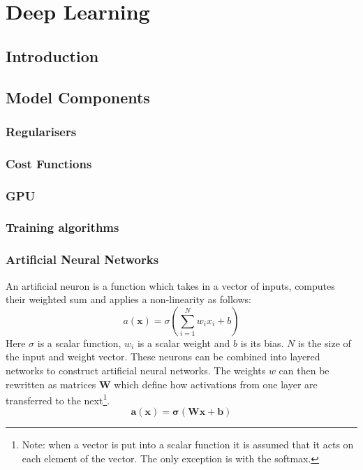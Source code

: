 \chapter{Deep Learning} \label{chapter:deep}
\section{Introduction}
\section{Model Components}
\subsection{Regularisers}
\subsection{Cost Functions}
\subsection{GPU} \label{sec:GPU}
\subsection{Training algorithms}
\subsection{Artificial Neural Networks}
An artificial neuron is a function which takes in a vector of inputs, computes their
weighted sum and applies a non-linearity as follows:
\begin{equation}
    a(\mathbf{x}) = \sigma \left ( \sum_{i=1}^N w_ix_i + b \right )
\end{equation}
Here $\sigma$ is a scalar function, $w_i$ is a scalar weight and $b$ is its bias. $N$ is the size of the input and weight vector.
These neurons can be combined into layered networks to construct artificial neural networks.
The weights $w$ can then be rewritten as matrices $\mathbf{W}$ which define how
activations from one layer are transferred to the next\footnote{Note: when a vector
is put into a scalar function it is assumed that it acts on each element of
the vector. The only exception is with the softmax.}.
\begin{equation}
    \mathbf{a}(\mathbf{x}) = \mathbf{\sigma} \left ( \mathbf{W}\mathbf{x} + \mathbf{b} \right ) \label{eq:softmax}
\end{equation}

